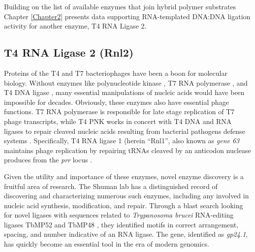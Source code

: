     Building on the list of available enzymes that join hybrid polymer substrates Chapter \ref{Chapter2} presents data supporting RNA-templated DNA:DNA ligation activity for another enzyme, T4 RNA Ligase 2.

  \subsection{T4 RNA Ligase 2 (Rnl2)}\label{sec:Rnl2}

    Proteins of the T4 and T7 bacteriophages have been a boon for molecular biology. Without enzymes like polynucleotide kinase \citep{Richardson1965a}, T7 RNA polymerase \citep{Summers1970b}, and T4 DNA ligase \citep{Weiss1967a}, many essential manipulations of nucleic acids would have been impossible for decades. Obviously, these enzymes also have essential phage functions. T7 RNA polymerase is responsible for late stage replication of T7 phage transcripts, while T4 PNK works in concert with T4 DNA and RNA ligases to repair cleaved  nucleic acids resulting from bacterial pathogens defense systems \citep{Wang2002b}. Specifically, T4 RNA ligase 1 (herein ``Rnl1'', also known as \textit{gene 63} maintains phage replication by repairing tRNAs cleaved by an anticodon nuclease produces from the \textit{prr} locus \citep{Amitsur1987d}.

    Given the utility and importance of these enzymes, novel enzyme discovery is a fruitful area of research. The Shuman lab has a distinguished record of discovering and characterizing numerous such enzymes, including any involved in nucleic acid synthesis, modification, and repair. Through a blast search looking for novel ligases with sequences related to \textit{Trypanosoma brucei} RNA-editing ligases TbMP52 and TbMP48 \citep{Ho2002b}, they identified motifs in correct arrangement, spacing, and number indicative of an RNA ligase. The gene, identified as \textit{gp24.1}, has quickly become an essential tool in the era of modern genomics.

